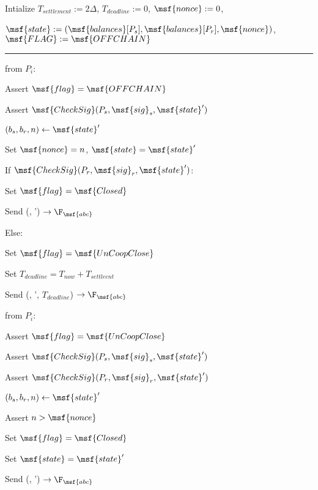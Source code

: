 \begin{bbox}[title={$\mathcal{C}_{pay}(P_s,P_r, \msf{balances}, \Delta)$}]

Intialize $T_{settlement} := 2 \Delta$, $T_{deadline} := 0$, $\msf{nonce} := 0$,


$\msf{state} := (\msf{balances}[P_s], \msf{balances}[P_r], \msf{nonce})$, $\msf{FLAG} := \msf{OFFCHAIN}$

\vspace{2mm} \hrule \vspace{2mm}

\OnInput {} from $P_i$:
	\begin{renumerate}
		\item Assert $\msf{flag} = \msf{OFFCHAIN}$
		\item Assert $\msf{CheckSig}(P_s,\msf{sig}_s, \msf{state}')$
		
		\item $(b_s, b_r, n) \leftarrow \msf{state}'$

		\item Set $\msf{nonce} = n$, $\msf{state} = \msf{state}'$

		If $\msf{CheckSig}(P_r, \msf{sig}_r, \msf{state}')$:
		\begin{renumerate}
			\item Set $\msf{flag} = \msf{Closed}$
			\item Send (, ') $\rightarrow \F_{\msf{abc}}$ 
		\end{renumerate}

		Else:
		\begin{renumerate}
			\item Set $\msf{flag} = \msf{UnCoopClose}$ 
			\item Set $T_{deadline} = T_{now} + T_{settleent}$
			\item Send (, ', $T_{deadline}$) $\rightarrow \F_{\msf{abc}}$
		\end{renumerate}
		
	\end{renumerate}

\OnInput {} from $P_i$:
	\begin{renumerate}
		\item Assert $\msf{flag} = \msf{UnCoopClose}$

		Assert $\msf{CheckSig}(P_s, \msf{sig}_s, \msf{state}')$

		Assert $\msf{CheckSig}(P_r, \msf{sig}_r, \msf{state}')$
		\item $(b_s, b_r, n) \leftarrow \msf{state}'$
		\item Assert $n > \msf{nonce}$

		\item Set $\msf{flag} = \msf{Closed}$
		
		Set $\msf{state} = \msf{state}'$
		\item Send (, ') $\rightarrow \F_{\msf{abc}}$
	\end{renumerate}
\end{bbox}

